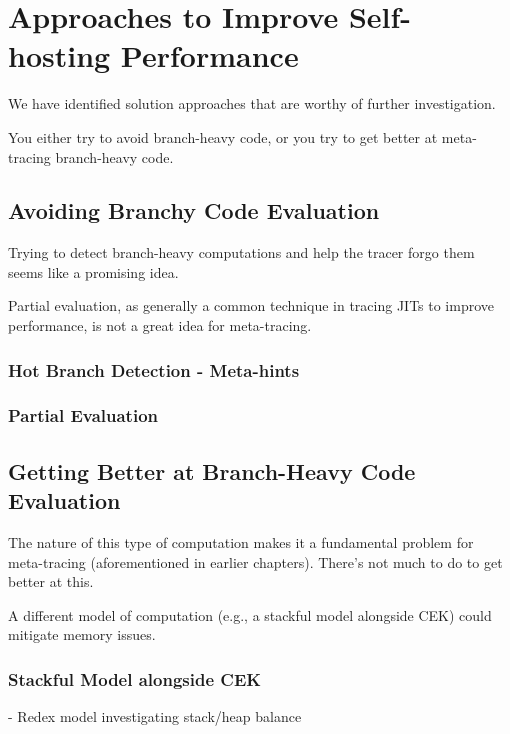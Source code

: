 \chapter{Approaches to Improve Self-hosting Performance}

	\label{chapter:solution}

	\begin{chapterpoint}
		We have identified solution approaches that are worthy of further investigation.

		You either try to avoid branch-heavy code, or you try to get better at meta-tracing branch-heavy code.
	\end{chapterpoint}

	\section{Avoiding Branchy Code Evaluation}
		\begin{mainpoint}
			Trying to detect branch-heavy computations and help the tracer forgo them seems like a promising idea.

			Partial evaluation, as generally a common technique in tracing JITs to improve performance, is not a great idea for meta-tracing.
		\end{mainpoint}
		\subsection{Hot Branch Detection - Meta-hints}
		\subsection{Partial Evaluation}

	\section{Getting Better at Branch-Heavy Code Evaluation}
		\begin{mainpoint}
			The nature of this type of computation makes it a fundamental problem for meta-tracing (aforementioned in earlier chapters). There's not much to do to get better at this.

			A different model of computation (e.g., a stackful model alongside CEK) could mitigate memory issues.
		\end{mainpoint}

		\subsection{Stackful Model alongside CEK}
		- Redex model investigating stack/heap balance

